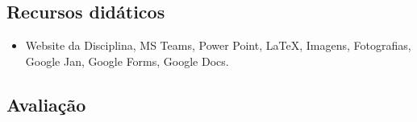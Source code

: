 \documentclass[
	article,			%
	12pt,				%
	twoside,			%
	a4paper,			%
	english,			%
	brazil,				%
	sumario=tradicional
]{plano}
\begin{document}





\begin{snugshade}
	\section{Recursos didáticos} %
\end{snugshade}

\begin{itemize}

	\item Website da Disciplina, MS Teams, Power Point, \LaTeX, Imagens, Fotografias, Google Jan, Google Forms, Google Docs.

\end{itemize}

\begin{snugshade}
	\section{Avaliação} %
\end{snugshade}

\end{document}

